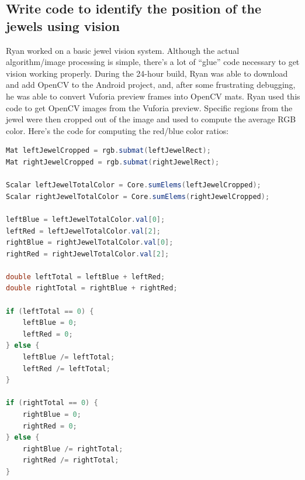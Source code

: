 \documentclass{article}
\begin{document}
\subsection{Write code to identify the position of the jewels using vision}
Ryan worked on a basic jewel vision system. Although the actual algorithm/image processing is simple, there's a lot of ``glue'' code necessary to get vision working properly. During the 24-hour build, Ryan was able to download and add OpenCV to the Android project, and, after some frustrating debugging, he was able to convert Vuforia preview frames into OpenCV mats. Ryan used this code to get OpenCV images from the Vuforia preview. Specific regions from the jewel were then cropped out of the image and used to compute the average RGB color. Here's the code for computing the red/blue color ratios:
\begin{lstlisting}[language=Java]
Mat leftJewelCropped = rgb.submat(leftJewelRect);
Mat rightJewelCropped = rgb.submat(rightJewelRect);

Scalar leftJewelTotalColor = Core.sumElems(leftJewelCropped);
Scalar rightJewelTotalColor = Core.sumElems(rightJewelCropped);

leftBlue = leftJewelTotalColor.val[0];
leftRed = leftJewelTotalColor.val[2];
rightBlue = rightJewelTotalColor.val[0];
rightRed = rightJewelTotalColor.val[2];

double leftTotal = leftBlue + leftRed;
double rightTotal = rightBlue + rightRed;

if (leftTotal == 0) {
    leftBlue = 0;
    leftRed = 0;
} else {
    leftBlue /= leftTotal;
    leftRed /= leftTotal;
}

if (rightTotal == 0) {
    rightBlue = 0;
    rightRed = 0;
} else {
    rightBlue /= rightTotal;
    rightRed /= rightTotal;
}
\end{lstlisting}
\end{document}
